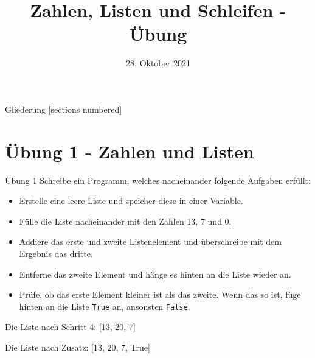 



\title{Zahlen, Listen und Schleifen - Übung}
\date{28. Oktober 2021}


\maketitle

\begin{frame}{Gliederung}
	[sections numbered]
	\tableofcontents
\end{frame}


\section{Übung 1 - Zahlen und Listen}
\begin{frame}{Übung 1}
	Schreibe ein Programm, welches nacheinander folgende Aufgaben erfüllt:
	\linebreak
	
	\begin{itemize}
		\item[\textbf{1.}] Erstelle eine leere Liste und speicher diese in einer Variable.
		\item[\textbf{2.}] Fülle die Liste nacheinander mit den Zahlen 13, 7 und 0.
		\item[\textbf{3.}] Addiere das erste und zweite Listenelement und überschreibe  mit dem Ergebnis das dritte.
		\item[\textbf{4.}] Entferne das zweite Element und hänge es hinten an die Liste wieder an.
		\item[\textbf{Zusatz}] Prüfe, ob das erste Element kleiner ist als das zweite. Wenn das so ist, füge hinten an die Liste \alert{\texttt{True}} an, ansonsten \alert{\texttt{False}}.
	\end{itemize}
	Die Liste nach Schritt 4: [13, 20, 7]
	
	Die Liste nach Zusatz: [13, 20, 7, True]
	
\end{frame}

